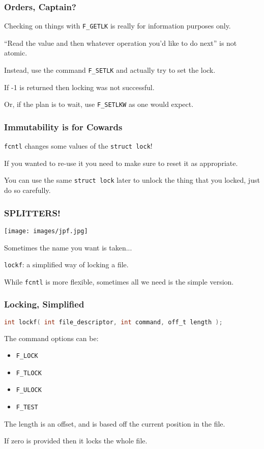 \begin{frame}
	\frametitle{Orders, Captain?}

	Checking on things with \texttt{F\_GETLK} is really for information purposes only.

	``Read the value and then whatever operation you'd like to do next'' is not
	atomic.

	Instead, use the command \texttt{F\_SETLK} and actually try to set the lock.

	If -1 is returned then locking was not successful.

	Or, if the plan is to wait, use \texttt{F\_SETLKW} as one would expect.

\end{frame}


\begin{frame}
	\frametitle{Immutability is for Cowards}

	\texttt{fcntl} changes some values of the \texttt{struct lock}!

	If you wanted to re-use it you need to make sure to reset it as appropriate.

	You can use the same \texttt{struct lock} later to unlock the thing that you locked, just do so carefully.

\end{frame}


\begin{frame}
	\frametitle{SPLITTERS!}
	\begin{center}
		\texttt{[image: images/jpf.jpg]}
	\end{center}

	Sometimes the name you want is taken...

	\texttt{lockf}: a simplified way of locking a file.

	While \texttt{fcntl} is more flexible, sometimes all we need is the simple version.

\end{frame}

\begin{frame}[fragile]
	\frametitle{Locking, Simplified}

	\begin{lstlisting}[language=C]
int lockf( int file_descriptor, int command, off_t length );
\end{lstlisting}

	The command options can be:
	\begin{itemize}
		\item \texttt{F\_LOCK}
		\item \texttt{F\_TLOCK}
		\item \texttt{F\_ULOCK}
		\item \texttt{F\_TEST}
	\end{itemize}

	The length is an offset, and is based off the current position in the file.

	If zero is provided then it locks the whole file.

\end{frame}


